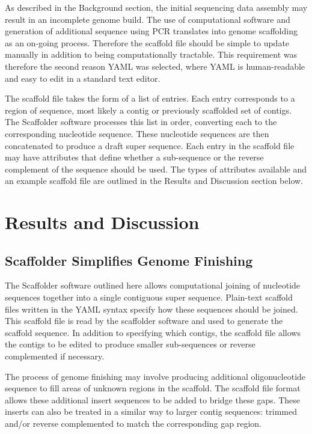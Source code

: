 \documentclass[10pt]{bmc_article}
\newenvironment{bmcformat}{\begin{raggedright}\baselineskip20pt\sloppy\setboolean{publ}{false}}{\end{raggedright}\baselineskip20pt\sloppy}
\begin{document}
\begin{bmcformat}
As described in the Background section, the initial sequencing data assembly
may result in an incomplete genome build. The use of computational software and
generation of additional sequence using PCR translates into genome scaffolding
as an on-going process. Therefore the scaffold file should be simple to update
manually in addition to being computationally tractable. This requirement was
therefore the second reason YAML was selected, where YAML is human-readable and
easy to edit in a standard text editor. \pb

The scaffold file takes the form of a list of entries. Each entry corresponds
to a region of sequence, most likely a contig or previously scaffolded set of
contigs. The Scaffolder software processes this list in order, converting each
to the corresponding nucleotide sequence. These nucleotide sequences are then
concatenated to produce a draft super sequence. Each entry in the scaffold file
may have attributes that define whether a sub-sequence or the reverse
complement of the sequence should be used. The types of attributes available
and an example scaffold file are outlined in the Results and Discussion section
below.  \pb

\clearpage

\section*{Results and Discussion} %

\subsection*{Scaffolder Simplifies Genome Finishing} %

The Scaffolder software outlined here allows computational joining of
nucleotide sequences together into a single contiguous super sequence.
Plain-text scaffold files written in the YAML syntax specify how these
sequences should be joined. This scaffold file is read by the scaffolder
software and used to generate the scaffold sequence. In addition to specifying
which contigs, the scaffold file allows the contigs to be edited to produce
smaller sub-sequences or reverse complemented if necessary. \pb

The process of genome finishing may involve producing additional
oligonucleotide sequence to fill areas of unknown regions in the scaffold. The
scaffold file format allows these additional insert sequences to be added to
bridge these gaps. These inserts can also be treated in a similar way to larger
contig sequences: trimmed and/or reverse complemented to match the
corresponding gap region. \pb


\end{bmcformat}
\end{document}
